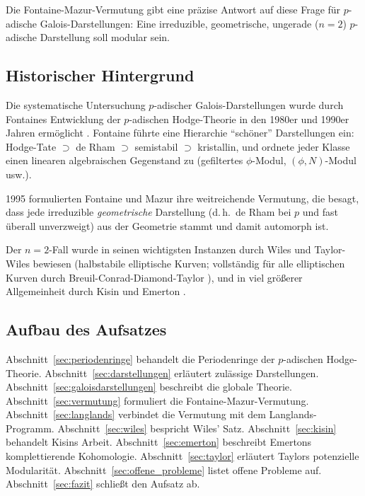 \documentclass[12pt,a4paper]{amsart}
\theoremstyle{definition}
\theoremstyle{remark}
\begin{document}
Die Fontaine-Mazur-Vermutung \cite{FM1995} gibt eine präzise Antwort auf diese Frage für
$p$-adische Galois-Darstellungen: Eine irreduzible, geometrische, ungerade ($n=2$)
$p$-adische Darstellung soll modular sein.

\subsection{Historischer Hintergrund}

Die systematische Untersuchung $p$-adischer Galois-Darstellungen wurde durch Fontaines
Entwicklung der $p$-adischen Hodge-Theorie in den 1980er und 1990er Jahren ermöglicht
\cite{Fontaine1979,Fontaine1982,Fontaine1994}.
Fontaine führte eine Hierarchie ``schöner'' Darstellungen ein:
Hodge-Tate $\supset$ de Rham $\supset$ semistabil $\supset$ kristallin,
und ordnete jeder Klasse einen linearen algebraischen Gegenstand zu
(gefiltertes $\phi$-Modul, $(\phi,N)$-Modul usw.).

1995 formulierten Fontaine und Mazur \cite{FM1995} ihre weitreichende Vermutung,
die besagt, dass jede irreduzible \emph{geometrische} Darstellung
(d.\,h.\ de Rham bei $p$ und fast überall unverzweigt) aus der Geometrie stammt
und damit automorph ist.

Der $n=2$-Fall wurde in seinen wichtigsten Instanzen durch Wiles \cite{Wiles1995} und
Taylor-Wiles \cite{TW1995} bewiesen (halbstabile elliptische Kurven; vollständig für
alle elliptischen Kurven durch Breuil-Conrad-Diamond-Taylor \cite{BCDT2001}),
und in viel größerer Allgemeinheit durch Kisin \cite{Kisin2009} und Emerton
\cite{Emerton2010}.

\subsection{Aufbau des Aufsatzes}

Abschnitt~\ref{sec:periodenringe} behandelt die Periodenringe der $p$-adischen
Hodge-Theorie.
Abschnitt~\ref{sec:darstellungen} erläutert zulässige Darstellungen.
Abschnitt~\ref{sec:galoisdarstellungen} beschreibt die globale Theorie.
Abschnitt~\ref{sec:vermutung} formuliert die Fontaine-Mazur-Vermutung.
Abschnitt~\ref{sec:langlands} verbindet die Vermutung mit dem Langlands-Programm.
Abschnitt~\ref{sec:wiles} bespricht Wiles' Satz.
Abschnitt~\ref{sec:kisin} behandelt Kisins Arbeit.
Abschnitt~\ref{sec:emerton} beschreibt Emertons komplettierende Kohomologie.
Abschnitt~\ref{sec:taylor} erläutert Taylors potenzielle Modularität.
Abschnitt~\ref{sec:offene_probleme} listet offene Probleme auf.
Abschnitt~\ref{sec:fazit} schließt den Aufsatz ab.
\end{document}

